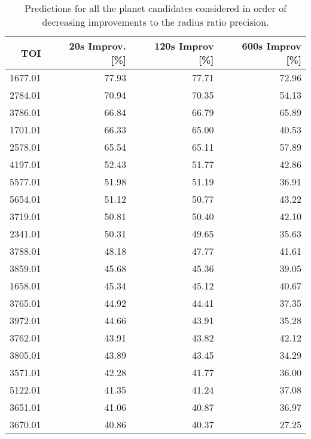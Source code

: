 \begin{table}
\centering
\caption{Predictions for all the planet candidates considered in order of decreasing improvements to the radius ratio precision.}
\begin{tabular}{rrrr}
\toprule
    TOI &  20s Improv. [\%] &  120s Improv [\%] &  600s Improv [\%] \\
\midrule
1677.01 &            77.93 &            77.71 &            72.96 \\
2784.01 &            70.94 &            70.35 &            54.13 \\
3786.01 &            66.84 &            66.79 &            65.89 \\
1701.01 &            66.33 &            65.00 &            40.53 \\
2578.01 &            65.54 &            65.11 &            57.89 \\
4197.01 &            52.43 &            51.77 &            42.86 \\
5577.01 &            51.98 &            51.19 &            36.91 \\
5654.01 &            51.12 &            50.77 &            43.22 \\
3719.01 &            50.81 &            50.40 &            42.10 \\
2341.01 &            50.31 &            49.65 &            35.63 \\
3788.01 &            48.18 &            47.77 &            41.61 \\
3859.01 &            45.68 &            45.36 &            39.05 \\
1658.01 &            45.34 &            45.12 &            40.67 \\
3765.01 &            44.92 &            44.41 &            37.35 \\
3972.01 &            44.66 &            43.91 &            35.28 \\
3762.01 &            43.91 &            43.82 &            42.12 \\
3805.01 &            43.89 &            43.45 &            34.29 \\
3571.01 &            42.28 &            41.77 &            36.00 \\
5122.01 &            41.35 &            41.24 &            37.08 \\
3651.01 &            41.06 &            40.87 &            36.97 \\
3670.01 &            40.86 &            40.37 &            27.25 \\

\end{tabular}
\end{table}
